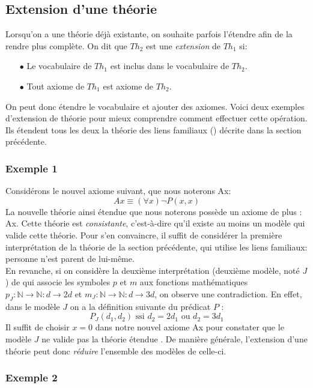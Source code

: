 {\subsection{Extension d'une théorie}
Lorsqu'on a une théorie déjà existante, on souhaite parfois l'étendre afin de la rendre plus complète.
On dit que $Th_2$ est une {\em extension} de $Th_1$ si:
\begin{itemize}
\item[$\bullet$] Le vocabulaire de $Th_1$ est inclus dans le vocabulaire de $Th_2$.
\item[$\bullet$] Tout axiome de $Th_1$ est axiome de $Th_2$.
\end{itemize}
On peut donc étendre le vocabulaire et ajouter des axiomes.
Voici deux exemples d'extension de théorie pour mieux comprendre comment effectuer cette opération. Ils étendent tous les deux
la théorie des liens familiaux () décrite dans la section précédente.

\subsubsection{Exemple 1}

Considérons le nouvel axiome suivant, que nous noterons Ax:
$$ Ax \equiv (\forall x) \neg P(x,x) $$
La nouvelle théorie ainsi étendue que nous noterons  possède un axiome de plus : Ax. Cette théorie 
est {\em consistante}, c'est-à-dire qu'il existe au moins un modèle qui valide cette théorie.
Pour s'en convaincre, il suffit de considérer la première interprétation de la théorie  de la section précédente,
qui utilise les liens familiaux: personne n'est parent de lui-même.\\

En revanche, si on considère la deuxième interprétation (deuxième modèle, noté $J$) de 
qui associe les symboles $p$ et $m$ aux fonctions mathématiques $p_J : \mathbb{N} \rightarrow \mathbb{N} : d \rightarrow 2d$ et $m_J : \mathbb{N} \rightarrow \mathbb{N} : d \rightarrow 3d$, on observe une contradiction.
En effet, dans le modèle $J$ on a la définition suivante du prédicat $P$ :
$$ P_J(d_1, d_2) \textrm{ ssi } d_2 = 2d_1 \textrm{ ou } d_2 = 3d_1$$
Il suffit de choisir $x=0$ dans notre nouvel axiome Ax pour constater que le modèle $J$ ne valide pas la théorie étendue .
De manière générale, l'extension d'une théorie peut donc {\em réduire} l'ensemble des modèles de celle-ci.

\subsubsection{Exemple 2}

}
